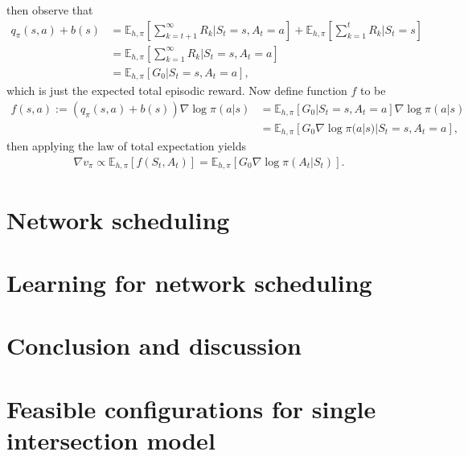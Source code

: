 \documentclass[a4paper]{report}
\theoremstyle{definition}
\theoremstyle{plain}
\begin{document}
then observe that
\begin{subequations}
\begin{align}
  q_{\pi}(s, a) + b(s) &= \mathbb{E}_{h,\pi}\left[ \sum_{k=t+1}^{\infty} R_{k} \Big| S_{t} = s , A_{t} = a \right] + \mathbb{E}_{h,\pi}\left[ \sum_{k=1}^{t} R_{k} \Big| S_{t} = s \right] \\
                     &= \mathbb{E}_{h,\pi}\left[ \sum_{k=1}^{\infty}  R_{k} \Big| S_{t} = s, A_{t} = a \right] \\
                     &= \mathbb{E}_{h,\pi} [ G_{0} | S_{t} = s, A_{t} = a ] ,
\end{align}
\end{subequations}
which is just the expected total episodic reward.
%
Now define function $f$ to be
\begin{subequations}
\begin{align}
  f(s, a) := (q_{\pi}(s, a) + b(s))\nabla \log \pi(a | s) &= \mathbb{E}_{h,\pi} \left[ G_{0} | S_{t} = s, A_{t} = a \right] \nabla \log \pi(a | s) \\
  &= \mathbb{E}_{h,\pi} \left[ G_{0} \nabla \log \pi(a | s) | S_{t} = s, A_{t} = a \right] ,
\end{align}
\end{subequations}
then applying the law of total expectation yields
\begin{align}
  \nabla v_{\pi} \propto \mathbb{E}_{h,\pi}[f(S_{t}, A_{t})] =  \mathbb{E}_{h, \pi} \left[ G_{0} \nabla \log \pi(A_{t} | S_{t}) \right] .
\end{align}


\chapter{Network scheduling}\label{chap:network}


\chapter{Learning for network scheduling}\label{chap:network-learning}

\chapter{Conclusion and discussion}\label{chap:conclusion}

\appendix
\chapter{Feasible configurations for single intersection
  model}\label{app:configuration-space}
\end{document}
